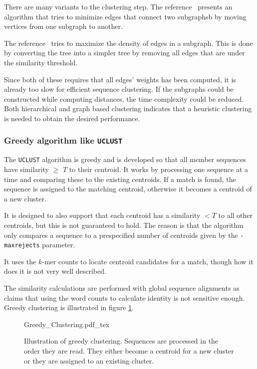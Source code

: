 There are many variants to the clustering step. The reference~\cite{hartuv}
presents an algorithm that tries to minimize edges that connect two subgraphsb by
moving vertices from one subgraph to another.

The reference~\cite{kawaji} tries to maximize the density of edges in a
subgraph. This is done by converting the tree into a simpler tree by removing
all edges that are under the similarity threshold.

Since both of these requires that all edges' weights has been computed, it is
already too slow for efficient sequence clustering. If the subgraphs could be
constructed while computing distances, the time complexity could be reduced.
Both hierarchical and graph based clustering indicates that a heuristic
clustering is needed to obtain the desired performance.


\subsubsection{Greedy algorithm like \texttt{UCLUST}}

The \texttt{UCLUST} algorithm is greedy and is developed so that all member
sequences have similarity $\geq$ $T$ to their centroid.  It works by processing
one sequence at a time and comparing these to the existing centroids. If a
match is found, the sequence is assigned to the matching centroid, otherwise it
becomes a centroid of a new cluster.

It is designed to also support that each centroid has a similarity $<T$ to all
other centroids, but this is not guaranteed to hold. The reason is that the
algorithm only compares a sequence to a prespecified number of centroids given
by the \texttt{-maxrejects} parameter.

It uses the $k$-mer counts to locate centroid candidates for a match, though
how it does it is not very well described.

The similarity calculations are performed with global sequence alignments as
\cite{usearch_algorithm} claims that using the word counts to calculate
identity is not sensitive enough. Greedy clustering is illustrated in figure
\ref{fig:greedy_clustering}.

\begin{figure}[h!]
  \def\svgwidth{\columnwidth}
  {Greedy_Clustering.pdf_tex}
  \caption{Illustration of greedy clustering. Sequences are processed in the
    order they are read. They either become a centroid for a new cluster or
    they are assigned to an existing cluster.}
  \label{fig:greedy_clustering}
\end{figure}


